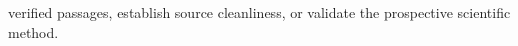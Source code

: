 \documentclass[11pt,a4paper]{article}
\begin{document}
verified passages, establish source cleanliness, or validate the prospective scientific method.



\end{document}

